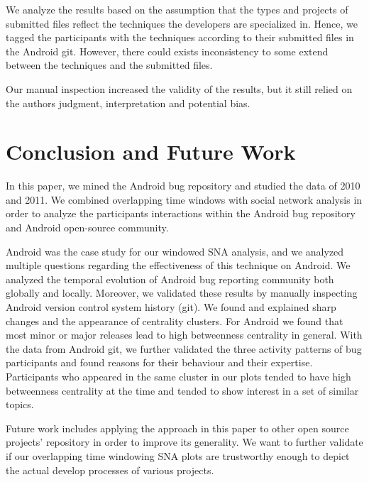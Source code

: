 \documentclass[conference]{IEEEtran}
\begin{document}

We analyze the results based on the assumption that the types and projects of
submitted files reflect the techniques the developers are specialized
in. Hence, we tagged the participants with the techniques according to
their submitted files in the Android git. However,
there could exists inconsistency to some extend between the techniques
and the submitted files.

Our manual inspection increased the validity of the results, but it
still relied on the authors judgment, interpretation and potential bias.

\section{Conclusion and Future Work}
\label{conclusion}

In this paper, we mined the Android bug repository and studied the
data of 2010 and 2011. We combined overlapping time windows with
social network analysis in order to analyze the participants
interactions within the Android bug repository and Android open-source community.

Android was the case study for our windowed SNA analysis, and we
analyzed multiple questions regarding the effectiveness of this
technique on Android.  We analyzed the temporal evolution of Android
bug reporting community both globally and locally.  Moreover, we
validated these results by manually inspecting Android version control
system history (git). We found and explained sharp changes and the
appearance of centrality clusters.  For Android we found that most
minor or major releases lead to high betweenness centrality in
general. With the data from Android git, we further
validated the three activity patterns of bug participants and found
reasons for their behaviour and their expertise.  Participants who
appeared in the same cluster in our plots tended to 
have high betweenness centrality at the time and tended to show interest
in a set of similar topics.


Future work includes applying the approach in this paper to other open
source projects' repository in order to improve its generality. We
want to further validate if our overlapping time windowing SNA plots
are trustworthy enough to depict the actual develop processes of
various projects.
\end{document}
